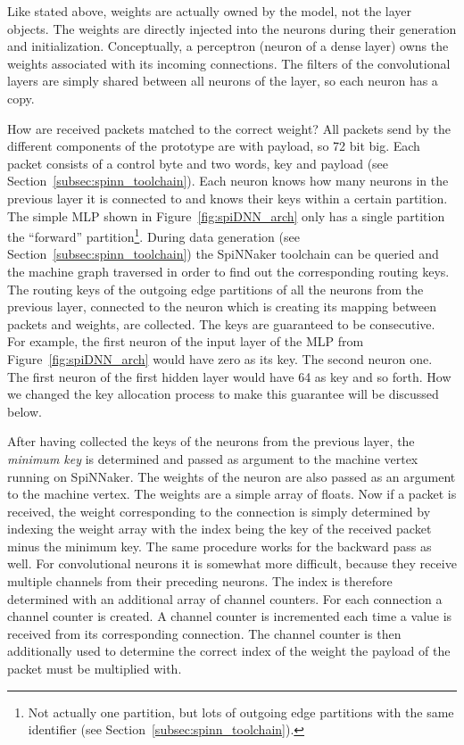 \documentclass[]{article}
\begin{document}
Like stated above, weights are actually owned by the model, not
the layer objects.
The weights are directly injected into the neurons during their
generation and initialization.
Conceptually, a perceptron (neuron of a dense layer) owns the weights
associated with its incoming connections.
The filters of the convolutional layers are simply shared between
all neurons of the layer, so each neuron has a copy.

How are received packets matched to the correct weight?
All packets send by the different components of the prototype are
with payload, so 72 bit big.
Each packet consists of a control byte and two words, key and payload
(see Section~\ref{subsec:spinn_toolchain}).
Each neuron knows how many neurons in the previous layer it is
connected to and knows their keys within a certain partition.
The simple MLP shown in Figure~\ref{fig:spiDNN_arch} only has a
single partition the ``forward'' partition\footnote{Not actually one
  partition, but lots of outgoing edge partitions with the same
  identifier (see Section~\ref{subsec:spinn_toolchain}).}.
During data generation (see Section~\ref{subsec:spinn_toolchain})
the SpiNNaker toolchain can be queried and the machine graph traversed
in order to find out the corresponding routing keys.
The routing keys of the outgoing edge partitions of all the neurons
from the previous layer, connected to the neuron which is creating its
mapping between packets and weights, are collected.
The keys are guaranteed to be consecutive.
For example, the first neuron of the input layer of the MLP from
Figure~\ref{fig:spiDNN_arch} would have zero as its key.
The second neuron one.
The first neuron of the first hidden layer would have 64 as key and so
forth.
How we changed the key allocation process to make this guarantee will
be discussed below.

After having collected the keys of the neurons from the previous
layer, the \textit{minimum key} is determined and passed as argument
to the machine vertex running on SpiNNaker.
The weights of the neuron are also passed as an argument to the
machine vertex.
The weights are a simple array of floats.
Now if a packet is received, the weight corresponding to the
connection is simply determined by indexing the weight array with the
index being the key of the received packet minus the minimum key.
The same procedure works for the backward pass as well.
For convolutional neurons it is somewhat more difficult, because they
receive multiple channels from their preceding neurons.
The index is therefore determined with an additional array of channel
counters.
For each connection a channel counter is created.
A channel counter is incremented each time a value is received from
its corresponding connection.
The channel counter is then additionally used to determine the correct
index of the weight the payload of the packet must be multiplied with.
\end{document}

